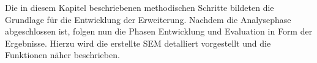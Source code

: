 Die in diesem Kapitel beschriebenen methodischen Schritte bildeten die Grundlage
für die Entwicklung der Erweiterung. Nachdem die Analysephase abgeschlossen ist,
folgen nun die Phasen Entwicklung und Evaluation in Form der Ergebnisse. Hierzu
wird die erstellte \ac{SEM} detalliert vorgestellt und die Funktionen näher beschrieben.
